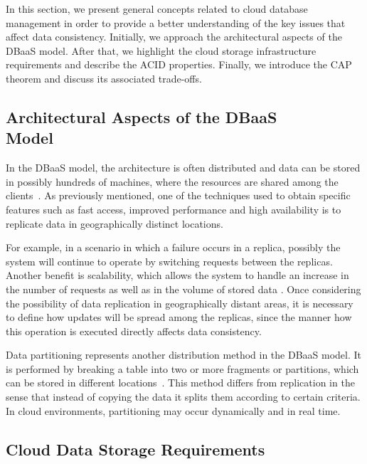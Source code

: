 In this section, we present general concepts related to cloud database management in order to provide a better understanding of the key issues that affect data consistency. Initially, we approach the architectural aspects of the DBaaS model. After that, we highlight the cloud storage infrastructure requirements and describe the ACID properties. Finally, we introduce the CAP theorem and discuss its associated trade-offs. 
\vspace{1mm}

\subsection{Architectural Aspects of the DBaaS \\ Model}

In the DBaaS model, the architecture is often distributed and data can be stored in possibly hundreds of machines, where the resources are shared among the clients~\cite{Xiong:2011}. As previously mentioned, one of the techniques used to obtain %
{\al specific} features
such as fast access, improved performance and high availability is to replicate data in geographically distinct locations.  %

{\al For example, in a scenario in which a failure occurs} in a replica, possibly the system will continue to operate by switching  requests between the replicas. Another benefit is scalability, {\al which allows} the system to handle an increase in the number of requests as well as in the volume of stored data \cite{tanenbaum:2007}. Once considering the possibility of data replication in geographically distant areas, it is necessary to define how updates will be spread among the replicas, since the manner how this operation is {\al executed directly affects data consistency.}

Data partitioning represents another distribution method in the DBaaS model. It is performed by breaking a table into two or more fragments or partitions, which can be stored in different locations~\cite{RahimiHaug:2010}. This method differs from replication in the sense that instead of copying the data it splits them according to certain criteria. 
In cloud environments, partitioning may occur dynamically and in real time.

\subsection{Cloud Data Storage Requirements}

